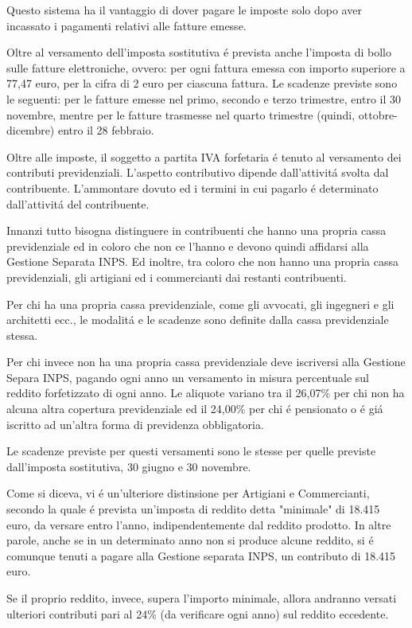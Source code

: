 \documentclass{article}
\begin{document}
Questo sistema ha il vantaggio di dover pagare le imposte solo dopo aver incassato i pagamenti relativi alle fatture emesse.

Oltre al versamento dell'imposta sostitutiva \'e prevista anche l'imposta di bollo sulle fatture elettroniche, ovvero:
per ogni fattura emessa con importo superiore a 77,47 euro, per la cifra di 2 euro per ciascuna fattura. Le scadenze previste sono le seguenti:
per le fatture emesse nel primo, secondo e terzo trimestre, entro il 30 novembre, mentre per le fatture trasmesse nel quarto trimestre (quindi, ottobre-dicembre) entro il 28 febbraio. 

Oltre alle imposte, il soggetto a partita IVA forfetaria \'e tenuto al versamento dei contributi previdenziali.
L'aspetto contributivo dipende dall'attivit\'a svolta dal contribuente.
L'ammontare dovuto ed i termini in cui pagarlo \'e determinato dall'attivit\'a del contribuente.

Innanzi tutto bisogna distinguere in contribuenti che hanno una propria cassa previdenziale ed in coloro che non ce l'hanno e devono quindi affidarsi alla Gestione Separata INPS.
Ed inoltre, tra coloro che non hanno una propria cassa previdenziali, gli artigiani ed i commercianti dai restanti contribuenti. 

Per chi ha una propria cassa previdenziale, come gli avvocati, gli ingegneri e gli architetti ecc., le modalit\'a e le scadenze sono definite dalla cassa previdenziale stessa. 

Per chi invece non ha una propria cassa previdenziale deve iscriversi alla Gestione Separa INPS, pagando ogni anno un versamento in misura percentuale sul reddito forfetizzato di ogni anno.
Le aliquote variano tra il 26,07\% per chi non ha alcuna altra copertura previdenziale ed il 24,00\% per chi \'e pensionato o \'e gi\'a iscritto ad un'altra forma di previdenza obbligatoria.

Le scadenze previste per questi versamenti sono le stesse per quelle previste dall'imposta sostitutiva, 30 giugno e 30 novembre.

Come si diceva, vi \'e un'ulteriore distinsione per Artigiani e Commercianti, secondo la quale \'e prevista un'imposta di reddito detta "minimale" di 18.415 euro, da versare entro l'anno, indipendentemente dal reddito prodotto.
In altre parole, anche se in un determinato anno non si produce alcune reddito, si \'e comunque tenuti a pagare alla Gestione separata INPS, un contributo di 18.415 euro.

Se il proprio reddito, invece, supera l'importo minimale, allora andranno versati ulteriori contributi pari al 24\% (da verificare ogni anno) sul reddito eccedente.
\end{document}
